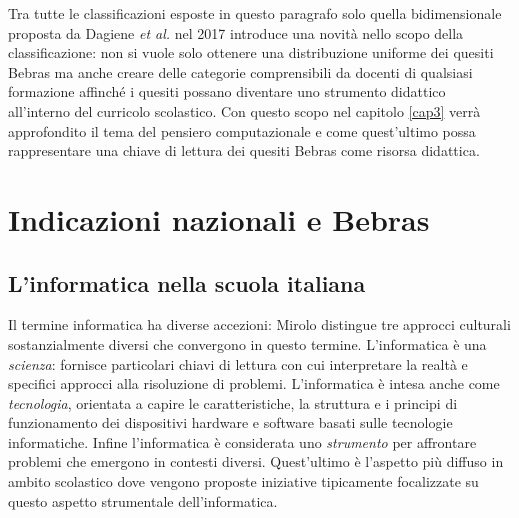 \documentclass[12pt]{report}
\begin{document}
Tra tutte le classificazioni esposte in questo paragrafo solo quella bidimensionale proposta da Dagiene \textit{et al.} \cite{DagieneINFORMATICA2017} nel 2017 introduce una novità nello scopo della classificazione: non si vuole solo ottenere una distribuzione uniforme dei quesiti Bebras ma anche creare delle categorie comprensibili da docenti di qualsiasi formazione affinché i quesiti possano diventare uno strumento didattico all'interno del curricolo scolastico.
Con questo scopo nel capitolo \ref{cap3} verrà approfondito il tema del pensiero computazionale e come quest'ultimo possa rappresentare una chiave di lettura dei quesiti Bebras come risorsa didattica.
%
%
\chapter{Indicazioni nazionali e Bebras}
\label{cap2}
\section{L'informatica nella scuola italiana}
%
Il termine informatica ha diverse accezioni:  Mirolo \cite{Mirolo2003} distingue tre approcci culturali sostanzialmente diversi che convergono in questo termine.
L'informatica è una \textit{scienza}: fornisce particolari chiavi di lettura con cui interpretare la realtà e specifici approcci alla risoluzione di problemi. 
L'informatica è intesa anche come \textit{tecnologia}, orientata a capire le caratteristiche, la struttura e i principi di funzionamento dei dispositivi hardware e software basati sulle tecnologie informatiche. 
Infine l'informatica è considerata uno \textit{strumento} per affrontare problemi che emergono in contesti diversi. Quest'ultimo è l'aspetto più diffuso in ambito scolastico dove vengono proposte iniziative tipicamente focalizzate su questo aspetto strumentale dell'informatica.
\end{document}
